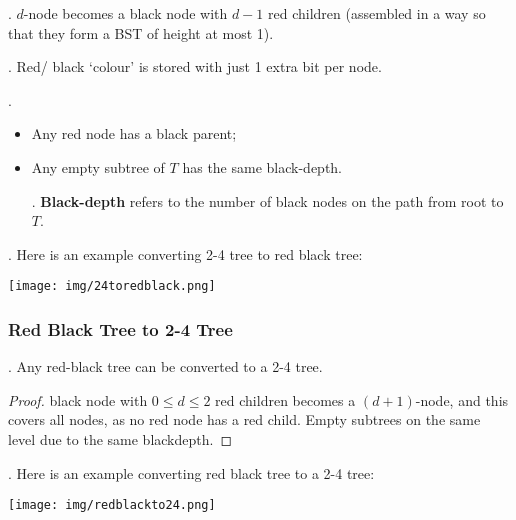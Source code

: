 \documentclass{article}
\begin{document}
\begin{algo}[].
    $d$-node becomes a black node with $d-1$ red children (assembled in a way so that they form a BST of height at most 1). 
\end{algo}

\begin{deff}.
    Red/ black `colour' is stored with just 1 extra bit per node. 
\end{deff}

\begin{result}[].
    \begin{itemize}
        \item Any red node has a black parent; 
        \item Any empty subtree of $T$ has the same black-depth.
        \begin{deff}.
            \textbf{Black-depth} refers to the number of black nodes on the path from root to $T$. 
        \end{deff}
    \end{itemize}
\end{result}

\begin{examplee}[].
    Here is an example converting 2-4 tree to red black tree: 
    \begin{center}
        \texttt{[image: img/24toredblack.png]}
    \end{center}
\end{examplee}

\subsubsection{Red Black Tree to 2-4 Tree} 

\begin{thmm}[]. 
    Any red-black tree can be converted to a 2-4 tree. 
\end{thmm}

\begin{proof}
    black node with $0 \leq d \leq 2$ red children becomes a $(d + 1)$-node, and this covers all nodes, as no red node has a red child. Empty subtrees on the same level due to the same blackdepth. 
\end{proof}

\begin{examplee}[].
    Here is an example converting red black tree to a 2-4 tree: 
    \begin{center}
        \texttt{[image: img/redblackto24.png]}
    \end{center}
\end{examplee}
\end{document}
